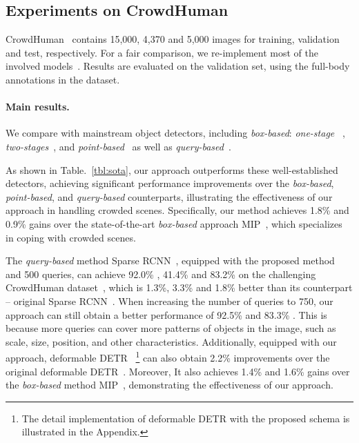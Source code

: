 \documentclass[final]{cvpr}
\begin{document}
\subsection{Experiments on CrowdHuman}
CrowdHuman~\cite{shao2018crowdhuman} contains 15,000, 4,370 and 5,000 images for training, validation and test, respectively. For a fair comparison, we re-implement most of the involved models~\cite{lin2017feature,huang2020nms,lin2020focal,liu2019adaptive,2020atss,chu2020detection,tian2021fcos, wang2020end,carion2020end,zhu2021deformable, sun2020sparse,lin2020detr, gossipnet, hu2018relation}. Results are evaluated on the validation set, using the full-body annotations in the dataset.

\vspace{-1pc}
\paragraph{Main results.} We compare with mainstream object detectors, including \textit{box-based}: \textit{one-stage}~\cite{lin2020focal, 2020atss} , \textit{two-stages}~\cite{chu2020detection,lin2017feature,huang2020nms,liu2019adaptive}, and \textit{point-based}~\cite{tian2021fcos, wang2020end} as well as \textit{query-based}~\cite{carion2020end,zhu2021deformable, sun2020sparse,lin2020detr}. 

As shown in Table.~\ref{tbl:sota}, our approach outperforms these well-established detectors, achieving significant performance improvements over the \textit{box-based}, \textit{point-based}, and \textit{query-based} counterparts, illustrating the effectiveness of our approach in handling crowded scenes. Specifically, our method achieves 1.8\%  and 0.9\%  gains over the state-of-the-art \textit{box-based} approach MIP~\cite{chu2020detection}, which specializes in coping with crowded scenes.

The \textit{query-based} method Sparse RCNN~\cite{sun2020sparse}, equipped with the proposed method and 500 queries, can achieve 92.0\% , 41.4\%  and 83.2\%  on the challenging CrowdHuman dataset~\cite{shao2018crowdhuman}, which is 1.3\%, 3.3\% and 1.8\% better than its counterpart -- original Sparse RCNN~\cite{sun2020sparse}. When increasing the number of queries to 750, our approach can still obtain a better performance of 92.5\%  and 83.3\% . This is because more queries can cover more patterns of objects in the image, such as scale, size, position, and other characteristics. Additionally, equipped with our approach, deformable DETR ~\cite{zhu2021deformable}\footnote{The detail implementation of deformable DETR with the proposed schema is illustrated in the Appendix.} can also obtain 2.2\%  improvements over the original deformable DETR~\cite{zhu2021deformable}. Moreover, It also achieves 1.4\%  and 1.6\%  gains over the \textit{box-based} method MIP~\cite{chu2020detection}, demonstrating the effectiveness of our approach.
 
\end{document}

